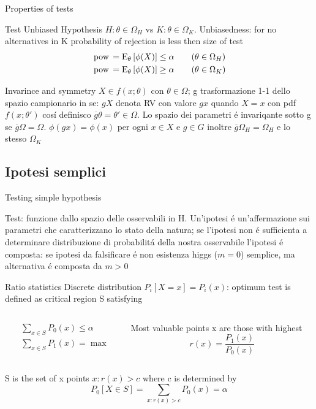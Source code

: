 \documentclass[asd-beamer.tex]{subfiles}
\begin{document}
\begin{frame}{Properties of tests}
\begin{block}{Test Unbiased}
Hypothesis $H: \theta\in\Omega_H$ vs $K:\theta\in\Omega_K$. Unbiasedness: for no alternatives in K probability of rejection is less then size of test
\begin{align*}
&\operatorname{pow}{}=\operatorname{E}_{\theta}{[\phi(X)]}\leq\alpha\tag{$\theta\in\Omega_H$}\\
&\operatorname{pow}{}=\operatorname{E}_{\theta}{[\phi(X)]}\geq\alpha\tag{$\theta\in\Omega_K$}
\end{align*}
\end{block}
\begin{block}{Invarince and symmetry}
$X\in f(x;\theta)$ con $\theta\in\Omega$; g trasformazione 1-1 dello spazio campionario in se: $gX$ denota RV con valore $gx$ quando $X=x$ con pdf $f(x;\theta')$ cos\'i definisco $\overline{g}\theta=\theta'\in\Omega$. Lo spazio dei parametri \'e invariqante sotto g se $\overline{g}\Omega=\Omega$.
 $\phi(gx)=\phi(x)$ per ogni $x\in X$ e $g\in G$ inoltre $\overline{g}\Omega_H=\Omega_H$ e lo stesso $\Omega_K$
\end{block}
\end{frame}

\subsection{Ipotesi semplici}

\begin{frame}{Testing simple hypothesis}
\begin{block}{Test: funzione dallo spazio delle osservabili in H.}
	Un'ipotesi \'e un'affermazione sui parametri che caratterizzano lo stato della natura; se l'ipotesi non \'e sufficienta a determinare distribuzione di probabilit\'a della nostra osservabile l'ipotesi \'e composta: se ipotesi da falsificare \'e non esistenza higgs ($m=0$) semplice, ma alternativa \'e composta da $m>0$
\end{block}
\begin{block}{Ratio statistics}
Discrete distribution $P_i[X=x]=P_i(x)$: optimum test is defined as critical region S satisfying
\begin{columns}[T]
\begin{column}{0.5\textwidth}
\begin{align*}
&\sum_{x\in S}P_0(x)\leq\alpha\\
&\sum_{x\in S}P_1(x)=\max{}
\end{align*}
\end{column}
\begin{column}{0.5\textwidth}
Most valuable points x are those with highest \[r(x)=\frac{P_1(x)}{P_0(x)}\]
\end{column}
\end{columns}
S is the set of x points $x: r(x)>c$ where c is determined by \[P_0[X\in S]=\sum_{x: r(x)>c}P_0(x)=\alpha\]
\end{block}
\end{frame}
\end{document}
